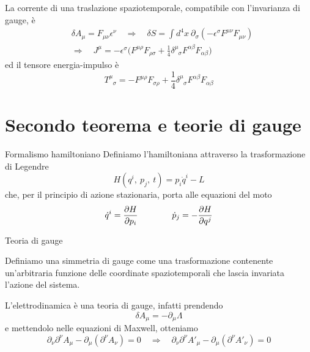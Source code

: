 \begin{frame}
    La corrente di una traslazione spaziotemporale, compatibile con l'invarianza di gauge, è 
    \begin{equation*}
    \begin{aligned}
        & \delta A_\mu = F_{\mu\nu} \epsilon^\nu \quad \Rightarrow \quad \delta S = \int d^4 x ~\partial_\sigma (-\epsilon^\sigma F^{\mu\nu} F_{\mu\nu}) \\ & \Rightarrow \quad J^\mu = - \epsilon^\sigma \Big ( F^{\mu\rho} F_{\rho\sigma} + \frac{1}{4} \delta^\mu_{\phantom \mu \sigma} F^{\alpha \beta} F_{\alpha \beta} \Big)
    \end{aligned}
    \end{equation*}
      ed il tensore energia-impulso è
    \begin{equation*}
        T^\mu_{\phantom \mu \sigma} = - F^{\mu\rho} F_{\sigma\rho} + \frac{1}{4} \delta^\mu_{\phantom \mu \sigma} F^{\alpha \beta} F_{\alpha \beta}
    \end{equation*}
\end{frame}

\section{Secondo teorema e teorie di gauge}

\begin{frame}{Formalismo hamiltoniano}
    Definiamo l'hamiltoniana attraverso la trasformazione di Legendre 
    \begin{equation*}
        H(q^i, ~p_j, ~t) = p_i \dot q^i - L
    \end{equation*}
    che, per il principio di azione stazionaria, porta alle equazioni del moto
    \begin{equation*}
        \dot q^i = \frac{\partial H}{\partial p_i} \qquad \qquad \dot p_j = - \frac{\partial H}{\partial q^j}
    \end{equation*}
\end{frame}

\begin{frame}{Teoria di gauge}

    Definiamo una simmetria di gauge come una trasformazione contenente un'arbitraria funzione delle coordinate spaziotemporali che lascia invariata l'azione del sistema. 

    \hfill
    
    L'elettrodinamica è una teoria di gauge, infatti prendendo 
    \begin{equation*}
        \delta A_\mu = - \partial_\mu \Lambda
    \end{equation*}
    e mettendolo nelle equazioni di Maxwell, otteniamo
    \begin{equation*}
        \partial_\nu \partial^\nu A_\mu - \partial_\mu (\partial^\nu A_\nu) = 0 \quad \Rightarrow \quad \partial_\nu \partial^\nu A'_\mu - \partial_\mu (\partial^\nu A'_\nu) = 0
    \end{equation*}
\end{frame}

